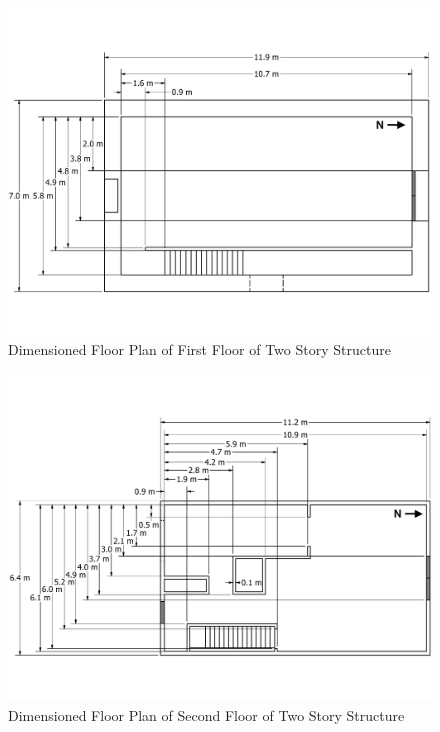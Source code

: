 \documentclass[12pt,oneside]{book}
\begin{document}
\begin{figure}[!ht]
	\includegraphics[width=\columnwidth]{../../DelCo_2014_2015/Drawings/PDFs/CAFS/West_Structure_1st_Floor_Plain}
	\caption{Dimensioned Floor Plan of First Floor of Two Story Structure}
	\label{fig:dimensioned_first_2story}
\end{figure}


\begin{figure}[!ht]
	\includegraphics[width=\columnwidth]{../../DelCo_2014_2015/Drawings/PDFs/CAFS/West_Structure_2nd_Floor_Plain}
	\caption{Dimensioned Floor Plan of Second Floor of Two Story Structure}
	\label{fig:dimensioned_second_2story}
\end{figure}
\end{document}
